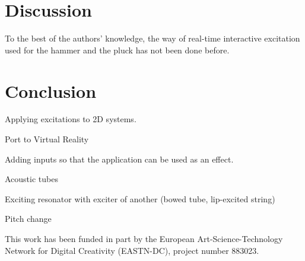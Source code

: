 \documentclass{article}
\begin{document}
\section{Discussion}
To the best of the authors' knowledge, the way of real-time interactive excitation used for the hammer and the pluck has not been done before. 

\section{Conclusion}

Applying excitations to 2D systems.

Port to Virtual Reality

Adding inputs so that the application can be used as an effect. 

Acoustic tubes

Exciting resonator with exciter of another (bowed tube, lip-excited string)

Pitch change


\begin{acknowledgments}
This work has been funded in part by the European Art-Science-Technology Network for Digital Creativity (EASTN-DC), project number 883023.
\end{acknowledgments} 


\end{document}
